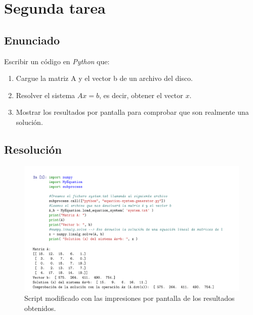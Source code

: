 \documentclass[12pt,twoside]{article}
\begin{document}
\section{Segunda tarea}

\subsection{Enunciado}

Escribir un código en \textit{Python} que:

\begin{enumerate}

\item Cargue la matriz A y el vector b de un archivo del disco.

\item Resolver el sistema $Ax=b$, es decir, obtener el vector $x$.

\item Mostrar los resultados por pantalla para comprobar que son realmente una solución.

\end{enumerate}

\subsection{Resolución}

\begin{figure}[hbt]
\begin{center}
	\includegraphics[width=1\textwidth]{task2.png}
	\caption{Script modificado con las impresiones por pantalla de los resultados obtenidos.}
	\label{fig:fig7}
\end{center}
\end{figure}


%
%
\end{document}
